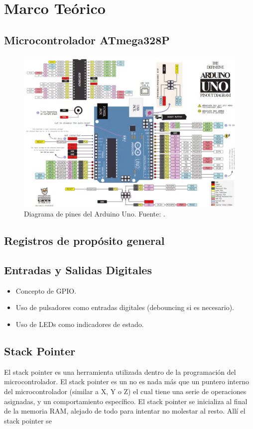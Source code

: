 \section{Marco Teórico}

\subsection{Microcontrolador ATmega328P}

\begin{figure}[H]
  \centering
  \includegraphics[width=\linewidth]{./Anexos/Full Arduino Pinout.png}
  \caption{Diagrama de pines del Arduino Uno. Fuente: \cite{arduino_uno_pinout}.}
  \label{fig:arduino-uno-pinout}
\end{figure}

\subsection{Registros de propósito general}

\subsection{Entradas y Salidas Digitales}
\begin{itemize}
    \item Concepto de GPIO.
    \item Uso de pulsadores como entradas digitales (debouncing si es necesario).
    \item Uso de LEDs como indicadores de estado.
\end{itemize}


\subsection{Stack Pointer}
El stack pointer es una herramienta utilizada dentro de la programación del microcontrolador. El stack pointer es un no es nada más que un puntero interno del microcontrolador (similar a X, Y o Z) el cual tiene una serie de operaciones asignadas, y un comportamiento específico. El stack pointer se inicializa al final de la memoria RAM, alejado de todo para intentar no molestar al resto. Allí el stack pointer se %

